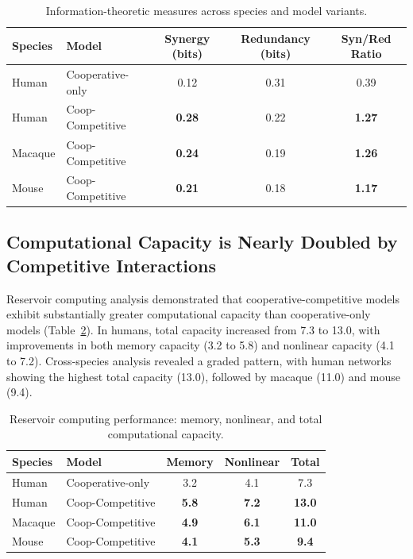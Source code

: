 \documentclass[11pt]{article}
\begin{document}
\begin{table}[ht]
\centering
\caption{Information-theoretic measures across species and model variants.}
\label{tab:info}
\begin{tabular}{@{}llccc@{}}
\toprule
Species & Model & Synergy (bits) & Redundancy (bits) & Syn/Red Ratio \\
\midrule
Human & Cooperative-only & 0.12 & 0.31 & 0.39 \\
Human & Coop-Competitive & \textbf{0.28} & 0.22 & \textbf{1.27} \\
Macaque & Coop-Competitive & \textbf{0.24} & 0.19 & \textbf{1.26} \\
Mouse & Coop-Competitive & \textbf{0.21} & 0.18 & \textbf{1.17} \\
\bottomrule
\end{tabular}
\end{table}

\subsection{Computational Capacity is Nearly Doubled by Competitive Interactions}

Reservoir computing analysis demonstrated that cooperative-competitive models exhibit substantially greater computational capacity than cooperative-only models (Table~\ref{tab:reservoir}). In humans, total capacity increased from 7.3 to 13.0, with improvements in both memory capacity (3.2 to 5.8) and nonlinear capacity (4.1 to 7.2). Cross-species analysis revealed a graded pattern, with human networks showing the highest total capacity (13.0), followed by macaque (11.0) and mouse (9.4).

\begin{table}[ht]
\centering
\caption{Reservoir computing performance: memory, nonlinear, and total computational capacity.}
\label{tab:reservoir}
\begin{tabular}{@{}llccc@{}}
\toprule
Species & Model & Memory & Nonlinear & Total \\
\midrule
Human & Cooperative-only & 3.2 & 4.1 & 7.3 \\
Human & Coop-Competitive & \textbf{5.8} & \textbf{7.2} & \textbf{13.0} \\
Macaque & Coop-Competitive & \textbf{4.9} & \textbf{6.1} & \textbf{11.0} \\
Mouse & Coop-Competitive & \textbf{4.1} & \textbf{5.3} & \textbf{9.4} \\
\bottomrule
\end{tabular}
\end{table}
\end{document}
